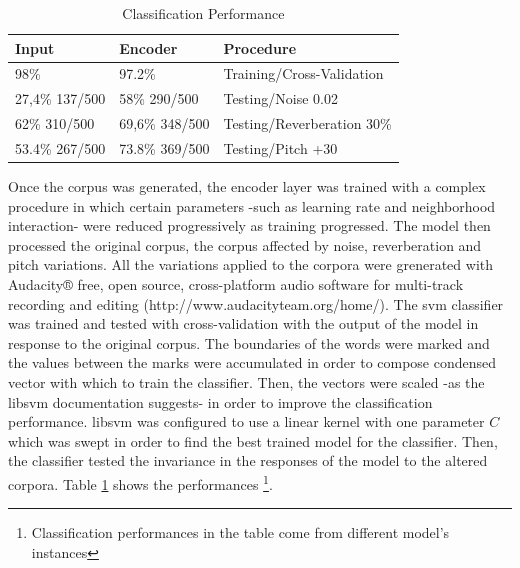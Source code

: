 \documentclass[11pt,a4paper]{article}
\begin{document}
\begin{table}[]
\centering
\caption{Classification Performance}
\label{classification_performances}
\begin{tabular}{|l|l|l|}
\hline
Input          & Encoder        & Procedure                  \\ \hline
98\%           & 97.2\%         & Training/Cross-Validation  \\ \hline
27,4\% 137/500 & 58\% 290/500   & Testing/Noise 0.02         \\ \hline
62\% 310/500   & 69,6\% 348/500 & Testing/Reverberation 30\% \\ \hline
53.4\% 267/500 & 73.8\% 369/500 & Testing/Pitch +30          \\ \hline
\end{tabular}
\end{table}

Once the corpus was generated, the encoder layer was trained with a complex procedure
in which certain parameters -such as learning rate and neighborhood interaction- were
reduced progressively as training progressed. 
The model then processed the original corpus, the corpus affected by noise,
reverberation and pitch variations.
All the variations applied to the corpora were grenerated with
Audacity® free, open source, cross-platform audio software for
multi-track recording and editing
(http://www.audacityteam.org/home/).
The \gls{svm} classifier was trained and tested with cross-validation
with the output of the model in response to the original corpus.
The boundaries of the words were marked and the values between the marks
were accumulated in order to compose condensed vector with which to train
the classifier. Then, the vectors were scaled -as the \gls{libsvm} documentation suggests-
in order to improve the classification performance.
\gls{libsvm} was configured to use a linear kernel with one parameter $C$ which
was swept in order to find the best trained model for the classifier.
Then, the classifier tested the invariance in the responses of the model
to the altered corpora.
Table \ref{classification_performances} shows the performances
\footnote{Classification performances in the table come from different model's instances}. \\




\end{document}
